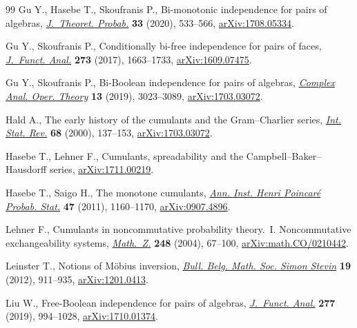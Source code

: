 \documentclass[pdftex]{sigma}
\numberwithin{equation}{section}
\begin{document}
\begin{thebibliography}{99}
Gu Y., Hasebe T., Skoufranis P., Bi-monotonic independence for pairs of
 algebras, \href{https://doi.org/10.1007/s10959-019-00884-2}{\textit{J.~Theoret. Probab.}} \textbf{33} (2020), 533--566,
 \href{https://arxiv.org/abs/1708.05334}{arXiv:1708.05334}.

Gu Y., Skoufranis P., Conditionally bi-free independence for pairs of faces,
 \href{https://doi.org/10.1016/j.jfa.2017.06.002}{\textit{J.~Funct. Anal.}} \textbf{273} (2017), 1663--1733,
 \href{https://arxiv.org/abs/1609.07475}{arXiv:1609.07475}.

Gu Y., Skoufranis P., Bi-{B}oolean independence for pairs of algebras,
 \href{https://doi.org/10.1007/s11785-017-0750-9}{\textit{Complex Anal. Oper. Theory}} \textbf{13} (2019), 3023--3089,
 \href{https://arxiv.org/abs/1703.03072}{arXiv:1703.03072}.

Hald A., The early history of the cumulants and the {G}ram--{C}harlier series,
 \href{https://doi.org/10.1111/j.1751-5823.2000.tb00318.x}{\textit{Int. Stat. Rev.}} \textbf{68} (2000), 137--153, \href{https://arxiv.org/abs/1703.03072}{arXiv:1703.03072}.

Hasebe T., Lehner F., Cumulants, spreadability and the
 {C}ampbell--{B}aker--{H}ausdorff series, \href{https://arxiv.org/abs/1711.00219}{arXiv:1711.00219}.

Hasebe T., Saigo H., The monotone cumulants, \href{https://doi.org/10.1214/10-AIHP379}{\textit{Ann. Inst. Henri
 Poincar\'e Probab. Stat.}} \textbf{47} (2011), 1160--1170, \href{https://arxiv.org/abs/0907.4896}{arXiv:0907.4896}.

Lehner F., Cumulants in noncommutative probability theory.~{I}.
 {N}oncommutative exchangeability systems, \href{https://doi.org/10.1007/s00209-004-0653-0}{\textit{Math.~Z.}} \textbf{248}
 (2004), 67--100, \href{https://arxiv.org/abs/math.CO/0210442}{arXiv:math.CO/0210442}.

Leinster T., Notions of {M}\"{o}bius inversion, \href{https://doi.org/10.36045/bbms/1354031556}{\textit{Bull. Belg. Math. Soc.
 Simon Stevin}} \textbf{19} (2012), 911--935, \href{https://arxiv.org/abs/1201.0413}{arXiv:1201.0413}.

Liu W., Free-{B}oolean independence for pairs of algebras, \href{https://doi.org/10.1016/j.jfa.2019.05.005}{\textit{J.~Funct.
 Anal.}} \textbf{277} (2019), 994--1028, \href{https://arxiv.org/abs/1710.01374}{arXiv:1710.01374}.


\end{thebibliography}
\end{document}
